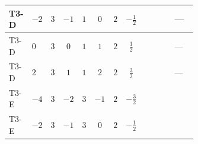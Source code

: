 \documentclass[8pt]{article}
\begin{document}
\begin{landscape}
\begin{longtable}{@{}llcccccc >{\raggedright\arraybackslash}p{0.21\linewidth} >{\raggedright\arraybackslash}p{0.21\linewidth} >{\raggedright\arraybackslash}p{0.21\linewidth}@{}}
\midrule
T3-D & $-2$ & $3$ & $-1$ & $1$ & $0$ & $2$ & $-\frac{1}{2}$ & \scriptsize\adjustbox{max width=\linewidth}{$\begin{gathered} +\frac{3 {\lambda_{HS_1}^{(A)}}^2}{2}\end{gathered}$} & \scriptsize\adjustbox{max width=\linewidth}{$\begin{gathered} +26 {\lambda_{S_1}^{(A)}}^2\end{gathered}$} & --- \\
\midrule
T3-D & $0$ & $3$ & $0$ & $1$ & $1$ & $2$ & $\frac{1}{2}$ & \scriptsize\adjustbox{max width=\linewidth}{$\begin{gathered} +\frac{3 {\lambda_{HS_1}^{(A)}}^2}{2}\end{gathered}$} & \scriptsize\adjustbox{max width=\linewidth}{$\begin{gathered} +26 {\lambda_{S_1}^{(A)}}^2\end{gathered}$} & --- \\
\midrule
T3-D & $2$ & $3$ & $1$ & $1$ & $2$ & $2$ & $\frac{3}{2}$ & \scriptsize\adjustbox{max width=\linewidth}{$\begin{gathered} +\frac{3 {\lambda_{HS_1}^{(A)}}^2}{2}\end{gathered}$} & \scriptsize\adjustbox{max width=\linewidth}{$\begin{gathered} +26 {\lambda_{S_1}^{(A)}}^2\end{gathered}$} & --- \\
\midrule
T3-E & $-4$ & $3$ & $-2$ & $3$ & $-1$ & $2$ & $-\frac{3}{2}$ & \scriptsize\adjustbox{max width=\linewidth}{$\begin{gathered} +\frac{3 {\lambda_{HS_1}^{(A)}}^2}{2}\end{gathered}$} & \scriptsize\adjustbox{max width=\linewidth}{$\begin{gathered} +26 {\lambda_{S_1}^{(A)}}^2\end{gathered}$} & \scriptsize\adjustbox{max width=\linewidth}{$\begin{gathered} +8 {\lambda_{12}^{(1)}} {\lambda_{12}^{(\times)}}\end{gathered}$} \\
\midrule
T3-E & $-2$ & $3$ & $-1$ & $3$ & $0$ & $2$ & $-\frac{1}{2}$ & \scriptsize\adjustbox{max width=\linewidth}{$\begin{gathered} +\frac{3 {\lambda_{HS_1}^{(A)}}^2}{2}\end{gathered}$} & \scriptsize\adjustbox{max width=\linewidth}{$\begin{gathered} +26 {\lambda_{S_1}^{(A)}}^2\end{gathered}$} & \scriptsize\adjustbox{max width=\linewidth}{$\begin{gathered} +8 {\lambda_{12}^{(1)}} {\lambda_{12}^{(\times)}}\end{gathered}$} \\

\end{longtable}
\end{landscape}
\end{document}
